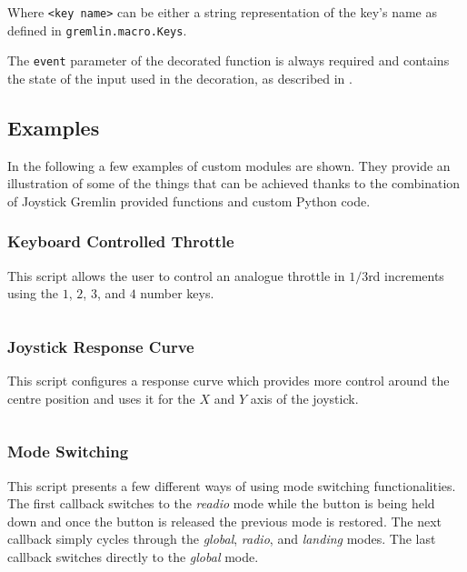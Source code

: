 \documentclass[a4, 10pt]{article}
\newcommand{\JG}{Joystick Gremlin}
\begin{document}
Where \verb+<key name>+ can be either a string representation of the
key's name as defined in \verb+gremlin.macro.Keys+.

The \verb+event+ parameter of the decorated function is always required
and contains the state of the input used in the decoration, as described
in .


\subsection{Examples}
\label{sec:cm_examples}

In the following a few examples of custom modules are shown. They
provide an illustration of some of the things that can be achieved
thanks to the combination of \JG{} provided functions and custom Python
code.


\subsubsection{Keyboard Controlled Throttle}

This script allows the user to control an analogue throttle in $1/3$rd
increments using the $1$, $2$, $3$, and $4$ number keys.

\inputminted[xleftmargin=2em]{python}{examples/keyboard_throttle.py}


\subsubsection{Joystick Response Curve}

This script configures a response curve which provides more control
around the centre position and uses it for the $X$ and $Y$ axis of the
joystick.

\inputminted[xleftmargin=2em]{python}{examples/response_curve.py}


\subsubsection{Mode Switching}

This script presents a few different ways of using mode switching
functionalities. The first callback switches to the \emph{readio} mode
while the button is being held down and once the button is released the
previous mode is restored. The next callback simply cycles through the
\emph{global}, \emph{radio}, and \emph{landing} modes. The last callback
switches directly to the \emph{global} mode.
\end{document}

